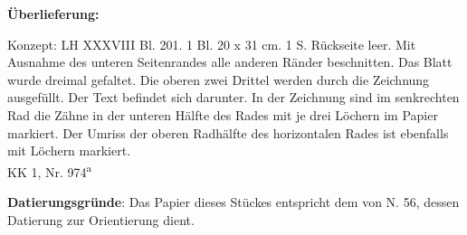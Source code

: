       
               
                \begin{ledgroupsized}[r]{120mm}
                \footnotesize 
                \pstart                
                \noindent\textbf{\"{U}berlieferung:}   
                \pend
                \end{ledgroupsized}
            
              
                            \begin{ledgroupsized}[r]{114mm}
                            \footnotesize 
                            \pstart \parindent -6mm
                            Konzept: LH XXXVIII Bl. 201. 1 Bl. 20 x 31 cm. 1 S.  R\"{u}ckseite leer. Mit Aus\-nahme des unteren Seitenrandes alle anderen R\"{a}nder beschnitten. Das Blatt wurde dreimal gefaltet. Die oberen zwei Drittel werden durch die Zeichnung ausgef\"{u}llt. Der Text befindet sich darunter. In der Zeichnung sind im senkrechten Rad die Z\"{a}hne in der unteren H\"{a}lfte des Rades mit je drei L\"{o}chern im Papier markiert. Der Umriss der oberen Radh\"{a}lfte des horizontalen Rades ist ebenfalls mit L\"{o}chern markiert.\\KK 1, Nr. 974\textsuperscript{a} \pend
                            \end{ledgroupsized}
                \vspace*{5mm}
                \begin{ledgroup}
                \footnotesize 
                \pstart
            \noindent\footnotesize{\textbf{Datierungsgr\"{u}nde}: Das Papier dieses St\"{u}ckes entspricht dem von N. 56, dessen Datierung zur Orientierung dient.}
                \pend
                \end{ledgroup}
            
